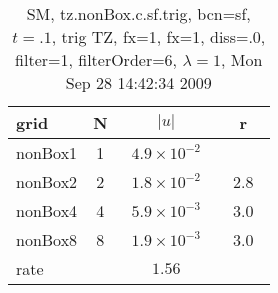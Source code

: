 \begin{table}[hbt]\tableFont %
\begin{center}
\begin{tabular}{|l|c|c|c|} \hline 
grid  & N &  $\vert u \vert$   & r \\ \hline 
             nonBox1 &     1 & ~$4.9\times10^{ -2}$~ &            \\ \hline
             nonBox2 &     2 & ~$1.8\times10^{ -2}$~ & ~$  2.8$~  \\ \hline
             nonBox4 &     4 & ~$5.9\times10^{ -3}$~ & ~$  3.0$~  \\ \hline
             nonBox8 &     8 & ~$1.9\times10^{ -3}$~ & ~$  3.0$~  \\ \hline
    rate             &       &       $1.56$         &        \\ \hline
\end{tabular}
\caption{SM, tz.nonBox.c.sf.trig, bcn=sf, $t=.1$, trig TZ, fx=1, fx=1, diss=.0, filter=1, filterOrder=6, $\lambda=1$, Mon Sep 28 14:42:34 2009}\label{table:tz.nonBox.c.sf.trig}
\end{center}
\end{table}
